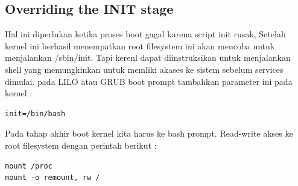 \subsection{Overriding the INIT stage}
Hal ini diperlukan ketika proses boot gagal karena script init rusak, Setelah kernel ini berhasil menempatkan root filesystem ini akan mencoba untuk menjalankan /sbin/init. Tapi kerenl dapat diinstruksikan untuk menjalankan shell yang memungkinkan untuk memliki akases ke sistem sebelum services dimulai.
pada LILO atau GRUB boot prompt tambahkan parameter ini pada kernel :
\begin{verbatim}
init=/bin/bash
\end{verbatim}
Pada tahap akhir boot kernel kita harus ke bash prompt. Read-write akses ke root filesystem dengan perintah berikut :
\begin{verbatim}
mount /proc
mount -o remount, rw /
\end{verbatim}

